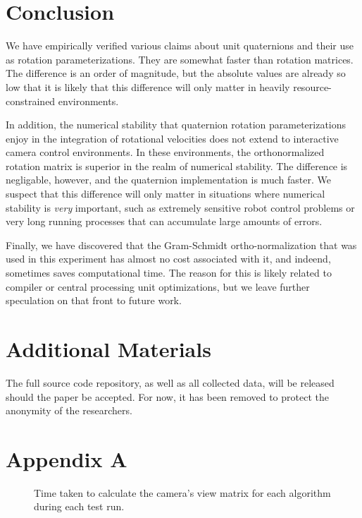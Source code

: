 \documentclass{acm_proc_article-sp}
\begin{document}
\section{Conclusion}

We have empirically verified various claims about unit quaternions and their use as rotation parameterizations.
They are somewhat faster than rotation matrices.
The difference is an order of magnitude, but the absolute values are already so low that it is likely that this difference will only matter in heavily resource-constrained environments.

In addition, the numerical stability that quaternion rotation parameterizations enjoy in the integration of rotational velocities does not extend to interactive camera control environments.
In these environments, the orthonormalized rotation matrix is superior in the realm of numerical stability.
The difference is negligable, however, and the quaternion implementation is much faster.
We suspect that this difference will only matter in situations where numerical stability is \emph{very} important, such as extremely sensitive robot control problems or very long running processes that can accumulate large amounts of errors.

Finally, we have discovered that the Gram-Schmidt ortho-normalization that was used in this experiment has almost no cost associated with it, and indeend, sometimes saves computational time.
The reason for this is likely related to compiler or central processing unit optimizations, but we leave further speculation on that front to future work.

\section{Additional Materials}

The full source code repository, as well as all collected data, will be released should the paper be accepted.
For now, it has been removed to protect the anonymity of the researchers.




\onecolumn
\newpage

\section*{Appendix A}

\begin{figure}[h]
\caption{Time taken to calculate the camera's view matrix for each algorithm during each test run.}
\label{fig:performance-table}
\end{figure}
\end{document}
